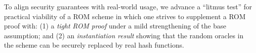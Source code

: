 To align  security guarantees with real-world usage, we advance a ``litmus test'' for practical viability of a ROM scheme in which one strives to  supplement a ROM proof with: (1) a \emph{tight ROM proof} under a mild strengthening of the base assumption; and (2) an \emph{instantiation result} showing that the random oracles in the scheme can be securely replaced by real hash functions. %

